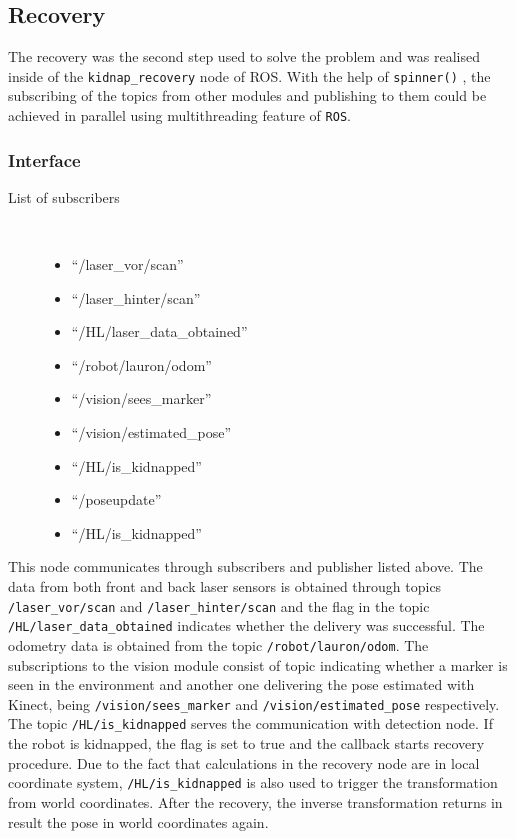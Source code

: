 \subsection{Recovery}
The recovery was the second step used to solve the problem and was realised inside of the \texttt{kidnap\_recovery} node of ROS. With the help of \texttt{spinner()} , the subscribing of the topics from other modules and publishing to them could be achieved in parallel using multithreading feature of \texttt{ROS}. 

\subsubsection{Interface}
\begin{description}
\item[List of subscribers]\
	\begin{itemize}
	\item ``/laser\_vor/scan'' 
	\item ``/laser\_hinter/scan'' 
	\item ``/HL/laser\_data\_obtained'' 
	\item ``/robot/lauron/odom'' 
	\item ``/vision/sees\_marker'' 
	\item ``/vision/estimated\_pose'' 
	\item ``/HL/is\_kidnapped'' 
	\item ``/poseupdate'' 
	\item ``/HL/is\_kidnapped'' 
	\end{itemize}
\end{description}	
	
This node communicates through subscribers and publisher listed above. The data from both front and back laser sensors is obtained through topics \texttt{/laser\_vor/scan} and \texttt{/laser\_hinter/scan} and the flag in the topic \texttt{/HL/laser\_data\_obtained} indicates whether the delivery was successful. The odometry data is obtained from the topic \texttt{/robot/lauron/odom}. The subscriptions to the vision module consist of topic indicating whether a marker is seen in the environment and another one delivering the pose estimated with Kinect, being \texttt{/vision/sees\_marker} and \texttt{/vision/estimated\_pose} respectively. The topic \texttt{/HL/is\_kidnapped} serves the communication with detection node. If the robot is kidnapped, the flag is set to true and the callback starts recovery procedure. Due to the fact that calculations in the recovery node are in local coordinate system, \texttt{/HL/is\_kidnapped} is also used to trigger the transformation from world coordinates. After the recovery, the inverse transformation returns in result the pose in world coordinates again.

